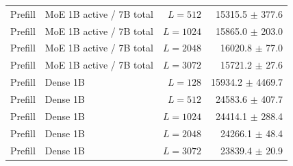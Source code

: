 \begin{tabular}{llrr}
Prefill & MoE 1B active / 7B total & $L=512$ & 15315.5 $\pm$ 377.6 \\
Prefill & MoE 1B active / 7B total & $L=1024$ & 15865.0 $\pm$ 203.0 \\
Prefill & MoE 1B active / 7B total & $L=2048$ & 16020.8 $\pm$ 77.0 \\
Prefill & MoE 1B active / 7B total & $L=3072$ & 15721.2 $\pm$ 27.6 \\
Prefill & Dense 1B & $L=128$ & 15934.2 $\pm$ 4469.7 \\
Prefill & Dense 1B & $L=512$ & 24583.6 $\pm$ 407.7 \\
Prefill & Dense 1B & $L=1024$ & 24414.1 $\pm$ 288.4 \\
Prefill & Dense 1B & $L=2048$ & 24266.1 $\pm$ 48.4 \\
Prefill & Dense 1B & $L=3072$ & 23839.4 $\pm$ 20.9 \\
\bottomrule
\end{tabular}
